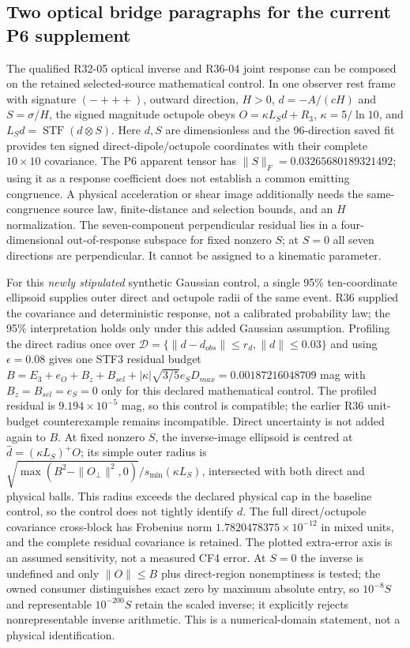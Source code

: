 \documentclass[
]{article}
\begin{document}
\hypertarget{two-optical-bridge-paragraphs-for-the-current-p6-supplement}{%
\subsection{Two optical bridge paragraphs for the current P6
supplement}\label{two-optical-bridge-paragraphs-for-the-current-p6-supplement}}

The qualified R32-05 optical inverse and R36-04 joint response can be
composed on the retained selected-source mathematical control. In one
observer rest frame with signature \((-+++)\), outward direction,
\(H>0\), \(d=-A/(cH)\) and \(S=\sigma/H\), the signed magnitude octupole
obeys \(O=\kappa L_Sd+R_3\), \(\kappa=5/\ln10\), and
\(L_Sd=\operatorname{STF}(d\otimes S)\). Here \(d,S\) are dimensionless
and the 96-direction saved fit provides ten signed
direct-dipole/octupole coordinates with their complete \(10\times10\)
covariance. The P6 apparent tensor has \(\|S\|_F=0.03265680189321492\);
using it as a response coefficient does not establish a common emitting
congruence. A physical acceleration or shear image additionally needs
the same-congruence source law, finite-distance and selection bounds,
and an \(H\) normalization. The seven-component perpendicular residual
lies in a four-dimensional out-of-response subspace for fixed nonzero
\(S\); at \(S=0\) all seven directions are perpendicular. It cannot be
assigned to a kinematic parameter.

For this \emph{newly stipulated} synthetic Gaussian control, a single
95\% ten-coordinate ellipsoid supplies outer direct and octupole radii
of the same event. R36 supplied the covariance and deterministic
response, not a calibrated probability law; the 95\% interpretation
holds only under this added Gaussian assumption. Profiling the direct
radius once over \(\mathcal D=\{\|d-d_{obs}\|\le r_d,\|d\|\le0.03\}\)
and using \(\epsilon=0.08\) gives one STF3 residual budget
\(B=E_3+e_O+B_z+B_{sel}+|\kappa|\sqrt{3/5}e_S D_{max}=0.00187216048709\)
mag with \(B_z=B_{sel}=e_S=0\) only for this declared mathematical
control. The profiled residual is \(9.194\times10^{-5}\) mag, so this
control is compatible; the earlier R36 unit-budget counterexample
remains incompatible. Direct uncertainty is not added again to \(B\). At
fixed nonzero \(S\), the inverse-image ellipsoid is centred at
\(\widehat d=(\kappa L_S)^+O\); its simple outer radius is
\(\sqrt{\max(B^2-\|O_\perp\|^2,0)}/s_{\min}(\kappa L_S)\), intersected
with both direct and physical balls. This radius exceeds the declared
physical cap in the baseline control, so the control does not tightly
identify \(d\). The full direct/octupole covariance cross-block has
Frobenius norm \(1.7820478375\times10^{-12}\) in mixed units, and the
complete residual covariance is retained. The plotted extra-error axis
is an assumed sensitivity, not a measured CF4 error. At \(S=0\) the
inverse is undefined and only \(\|O\|\le B\) plus direct-region
nonemptiness is tested; the owned consumer distinguishes exact zero by
maximum absolute entry, so \(10^{-8}S\) and representable \(10^{-200}S\)
retain the scaled inverse; it explicitly rejects nonrepresentable
inverse arithmetic. This is a numerical-domain statement, not a physical
identification.
\end{document}
